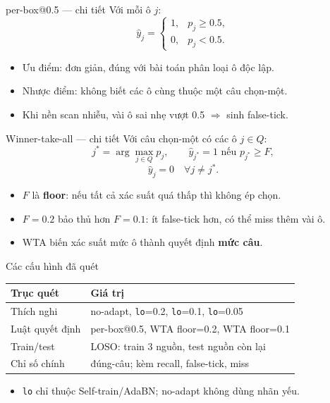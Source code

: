 \documentclass{beamer}
\newcommand{\hl}[1]{\textbf{#1}}
\begin{document}
\begin{frame}{per-box@0.5 --- chi tiết}
Với mỗi ô $j$:
\[
\hat y_j =
\begin{cases}
1, & p_j \ge 0.5,\\
0, & p_j < 0.5.
\end{cases}
\]
\vspace{0.2cm}
\begin{itemize}
    \item Ưu điểm: đơn giản, đúng với bài toán phân loại ô độc lập.
    \item Nhược điểm: không biết các ô cùng thuộc một câu chọn-một.
    \item Khi nền scan nhiễu, vài ô sai nhẹ vượt 0.5 $\Rightarrow$ sinh false-tick.
\end{itemize}
\end{frame}

\begin{frame}{Winner-take-all --- chi tiết}
Với câu chọn-một có các ô $j\in Q$:
\[
j^*=\arg\max_{j\in Q} p_j,\qquad
\hat y_{j^*}=1 \text{ nếu } p_{j^*}\ge F,
\]
\[
\hat y_j=0 \quad \forall j\ne j^* .
\]
\vspace{0.2cm}
\begin{itemize}
    \item $F$ là \hl{floor}: nếu tất cả xác suất quá thấp thì không ép chọn.
    \item $F=0.2$ bảo thủ hơn $F=0.1$: ít false-tick hơn, có thể miss thêm vài ô.
    \item WTA biến xác suất mức ô thành quyết định \hl{mức câu}.
\end{itemize}
\end{frame}

\begin{frame}{Các cấu hình đã quét}
\footnotesize
\begin{center}
\begin{tabular}{|l|l|}
\hline
\textbf{Trục quét} & \textbf{Giá trị} \\
\hline
Thích nghi & no-adapt, \texttt{lo}=0.2, \texttt{lo}=0.1, \texttt{lo}=0.05 \\
\hline
Luật quyết định & per-box@0.5, WTA floor=0.2, WTA floor=0.1 \\
\hline
Train/test & LOSO: train 3 nguồn, test nguồn còn lại \\
\hline
Chỉ số chính & đúng-câu; kèm recall, false-tick, miss \\
\hline
\end{tabular}
\end{center}
\vspace{0.25cm}
\begin{itemize}
    \item \texttt{lo} chỉ thuộc Self-train/AdaBN; no-adapt không dùng nhãn yếu.
\end{itemize}
\end{frame}
\end{document}
